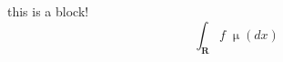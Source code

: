 \documentclass{presentation}
\begin{document}
    \begin{frame}[plain, c]
        \titlepage
    \end{frame}

    \section*{\contentsname}    
    \begin{frame}[allowframebreaks]{\contentsname}
        \tableofcontents
    \end{frame}

    \begin{frame}
        \begin{block}{this is a block!}
            \begin{equation*}
                \int_\mathbf{R} f \;\upmu(dx)
            \end{equation*}
        \end{block}
    \end{frame}
\end{document}
